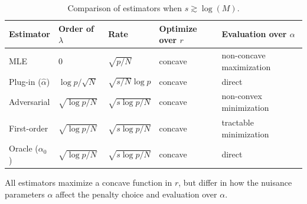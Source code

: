 \documentclass[11pt]{article}
\begin{document}
\begin{table}[htp!]
\centering
\caption{Comparison of estimators when $s\gtrsim\log(M)$.}
\begin{tabular}{p{2.0cm}p{2.0cm}p{}p{2.8cm}p{4.8cm}}
\toprule
Estimator & Order of $\lambda$ & Rate & Optimize over $r$ & Evaluation over $\alpha$ \\
\midrule
MLE & $0$ & $\sqrt{p/N}$ & concave & non-concave maximization \\
Plug-in ($\hat{\alpha}$) & $\log p/\sqrt{N}$ & $\sqrt{s/N}\log p$ & concave & direct \\
Adversarial & $\sqrt{\log p/N}$ & $\sqrt{s\log p/N}$ & concave & non-convex minimization \\
First-order & $\sqrt{\log p/N}$ & $\sqrt{s\log p/N}$ & concave & tractable minimization \\
Oracle ($\alpha_0$) & $\sqrt{\log p/N}$ & $\sqrt{s\log p/N}$ & concave & direct \\
\bottomrule
\end{tabular}
\begin{tablenotes}
\small
\item[a] All estimators maximize a concave function in $r$, but differ in how the nuisance parameters $\alpha$ affect the penalty choice and evaluation over $\alpha$.
\end{tablenotes}
\label{table:comparison}
\end{table}
\end{document}
